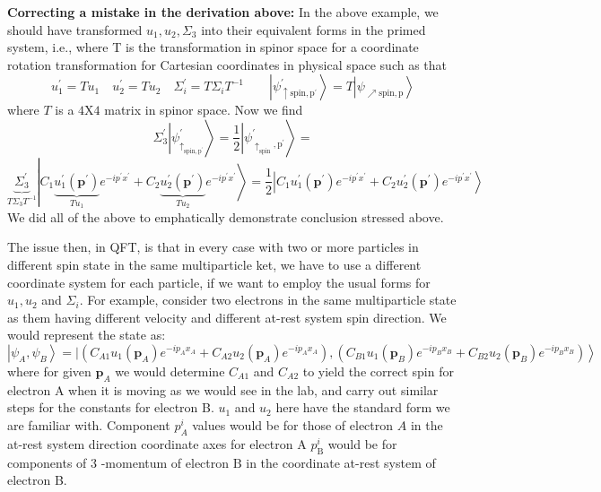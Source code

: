 \textbf{Correcting a mistake in the derivation above:} In the above example, we should have transformed $u_{1}, u_{2}, \Sigma_{3}$ into their equivalent forms in the primed system, i.e., where T is the transformation in spinor space for a coordinate rotation transformation for Cartesian coordinates in physical space such as that 
$$
u_{1}^{\prime}=T u_{1} \quad u_{2}^{\prime}=T u_{2} \quad \Sigma_{i}^{\prime}=T \Sigma_{i} T^{-1} \quad\quad\left|\psi^{\prime}_{\uparrow\mathrm{spin}, \mathrm{p}^{\prime}}\right\rangle= T\left|\psi_{\nearrow\mathrm{spin}, \mathrm{p}}\right\rangle
$$
where $T$ is a $4 \mathrm{X} 4$ matrix in spinor space. Now we find
$$
\Sigma_{3}^{\prime}\left|\psi_{\uparrow_{\mathrm{spin}, \mathrm{p}^{\prime}}}^{\prime}\right\rangle=\frac{1}{2}\left|\psi_{\uparrow_{\mathrm{spin}}, \mathrm{p}^{\prime}}^{\prime}\right\rangle=
$$
$$
\left.\left.\underbrace{\Sigma_{3}^{\prime}}_{T \Sigma_{3} T^{-1}}\right|{C_{1}} \underbrace{u_{1}^{\prime}\left(\mathbf{p}^{\prime}\right)}_{T u_{1}} e^{-i p^{\prime} x^{\prime}}+C_{2} \underbrace{u_{2}^{\prime}\left(\mathbf{p}^{\prime}\right)}_{T u_{2}} e^{-i p^{\prime} x^{\prime}}\right\rangle=\frac{1}{2}\left|C_{1} u_{1}^{\prime}\left(\mathbf{p}^{\prime}\right) e^{-i p^{\prime} x^{\prime}}+C_{2} u_{2}^{\prime}\left(\mathbf{p}^{\prime}\right) e^{-i p^{\prime} x^{\prime}}\right\rangle
$$
We did all of the above to emphatically demonstrate conclusion stressed above.

The issue then, in QFT, is that in every case with two or more particles in different spin state in the same multiparticle ket, we have to use a different coordinate system for each particle, if we want to employ the usual forms for $u_1,u_2$ and $\Sigma_i$. For example, consider two electrons in the same multiparticle state as them having different velocity and different at-rest system spin direction. We would represent the state as:
\begin{equation}
\left|\psi_{A}, \psi_{B}\right\rangle=|\left(C_{A 1} u_{1}\left(\mathbf{p}_{A}\right) e^{-i p_{A} x_{A}}+C_{A 2} u_{2}\left(\mathbf{p}_{A}\right) e^{-i p_{A} x_{A}}\right),\left.\left(C_{B 1} u_{1}\left(\mathbf{p}_{B}\right) e^{-i p_{B} x_{B}}+C_{B 2} u_{2}\left(\mathbf{p}_{B}\right) e^{-i p_{B} x_{B}}\right)\right\rangle
\end{equation}
where for given $\mathbf{p}_{A}$ we would determine $C_{A 1}$ and $C_{A 2}$ to yield the correct spin for electron A when it is moving as we would see in the lab, and carry out similar steps for the constants for electron B. $u_{1}$ and $u_{2}$ here have the standard form we are familiar with. Component $p_{A}^{i}$ values would be for those of electron $A$ in the at-rest system direction coordinate axes for electron A $p_{\mathrm{B}}^{i}$ would be for components of 3 -momentum of electron $\mathrm{B}$ in the coordinate at-rest system of electron B.

